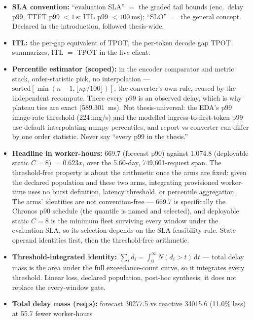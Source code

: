 \documentclass[11pt,a4paper]{article}
\def\times{x}\def\rho{rho}\def\approx{~}\def\leq{<=}\def\geq{>=}%
\def\emph#1{#1}\def\texttt#1{#1}%
\begin{document}
\begin{itemize}
\item \textbf{SLA convention:} ``evaluation SLA'' $=$ the graded tail bounds
  (enc.\ delay p99, TTFT p99 $<\SI{1}{\second}$; ITL p99
  $<\SI{100}{\milli\second}$); ``SLO'' $=$ the general concept. Declared in
  the introduction, followed thesis-wide.
\item \textbf{ITL:} the per-gap equivalent of TPOT, the per-token decode gap
  TPOT summarizes; ITL $=$ TPOT in the live client.
\item \textbf{Percentile estimator (scoped):} in the \emph{encoder comparator
  and metric stack}, order-statistic pick, no interpolation ---
  $\text{sorted}[\min(n{-}1,\lfloor np/100 \rfloor)]$, the converter's own
  rule, reused by the independent recompute. There every p99 is an observed
  delay, which is why plateau ties are exact (\SI{589.301}{\milli\second}).
  \emph{Not} thesis-universal: the EDA's p99 image-\emph{rate} threshold
  (\num{224}\,\si{img/s}) and the modelled ingress-to-first-token p99 use
  default interpolating \texttt{numpy} percentiles, and report-vs-converter
  can differ by one order statistic. Never say ``every p99 in the thesis.''
\item \textbf{Headline in worker-hours:} 669.7 (forecast p90) against
  1{,}074.8 (deployable static $C{=}8$) $= 0.623\times$, over the 5.60-day,
  749{,}601-request span. The threshold-free property is about the
  \emph{arithmetic once the arms are fixed}: \emph{given the declared
  population and these two arms, integrating provisioned worker-time uses no
  burst definition, latency threshold, or percentile aggregation}. The arms'
  \emph{identities} are not convention-free --- 669.7 is specifically the
  Chronos p90 schedule (the quantile is named and selected), and deployable
  static $C{=}8$ is the minimum fleet surviving every window \emph{under the
  evaluation SLA}, so its selection depends on the SLA feasibility rule.
  State operand identities first, then the threshold-free arithmetic.
\item \textbf{Threshold-integrated identity:}
  $\sum_i d_i = \int_0^\infty N(d_i>t)\,\mathrm{d}t$ --- total delay mass is
  the area under the full exceedance-count curve, so it integrates every
  threshold. Linear loss, declared population, post-hoc synthesis; it does
  not replace the every-window gate.
\item \textbf{Total delay mass (req$\cdot$s):} forecast \num{30277.5} vs
  reactive \num{34015.6} (11.0\% less) at \num{55.7} fewer worker-hours

\end{itemize}
\end{document}

